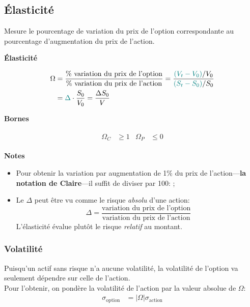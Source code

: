 \documentclass[10pt, french]{article}
\begin{document}
\begin{multicols*}{2}
\columnbreak

\subsection*{Élasticité}


\begin{definitionNOHFILL}[Élasticité $\Omega	=	\frac{\Delta S}{V}$]
Mesure le pourcentage de variation du prix de l'option correspondante au pourcentage d'augmentation du prix de l'action.

\tcbline

\begin{center}
	\textbf{Élasticité}
\end{center}
\begin{align*}
		\Omega
		&=	\frac{\text{\% variation du prix de l'option}}{\text{\% variation du prix de l'action}}	
		=	\frac{{\color{teal}(V_{t} - V_{0})}/V_{0}}{{\color{teal}(S_{t} - S_{0})}/S_{0}}	\\
		&=	{\color{teal}\Delta} \cdot \frac{S_{0}}{V_{0}}
		=	\frac{\Delta S_{0}}{V}
\end{align*}

\begin{center}
	\textbf{Bornes}
\end{center}
\begin{gather}
\begin{align*}
	\Omega_{C}	&\ge		1	&
	\Omega_{P}	&\le		0
\end{align*}
\end{gather}

\tcbline

\begin{center}
	\textbf{Notes}
\end{center}
\begin{itemize}[leftmargin = *]
	\item	Pour obtenir la variation par augmentation de 1\% du prix de l'action---\textbf{la notation de Claire}---il suffit de diviser par 100: ;
	\item	Le $\Delta$ peut être vu comme le risque \textit{absolu} d'une action: \[\Delta = \frac{\text{variation du prix de l'option}}{\text{variation du prix de l'action}}\]
			L'élasticité évalue plutôt le risque \textit{relatif} au montant.
\end{itemize}
\end{definitionNOHFILL}

\subsubsection*{Volatilité}
Puisqu'un actif sans risque n'a aucune volatilité, la volatilité de l'option va seulement dépendre sur celle de l'action.\\
Pour l'obtenir, on pondère la volatilité de l'action par la valeur absolue de $\Omega$:
\begin{align*}
	\sigma_{\text{option}}
	&=	| \Omega | \sigma_{\text{action}}
\end{align*}


\end{multicols*}
\end{document}
